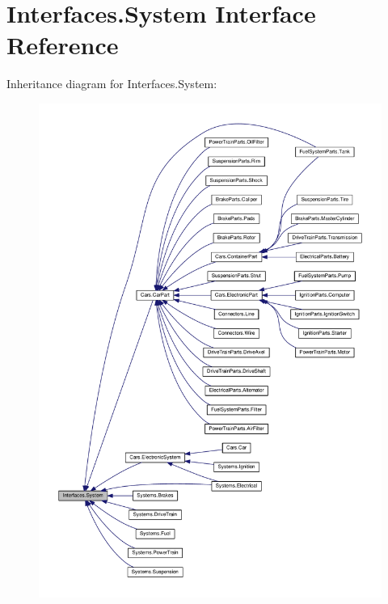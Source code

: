 \hypertarget{interfaceInterfaces_1_1System}{}\section{Interfaces.\+System Interface Reference}
\label{interfaceInterfaces_1_1System}


Inheritance diagram for Interfaces.\+System\+:\nopagebreak
\begin{figure}[H]
\begin{center}
\leavevmode
\includegraphics[width=350pt]{interfaceInterfaces_1_1System__inherit__graph}
\end{center}
\end{figure}
